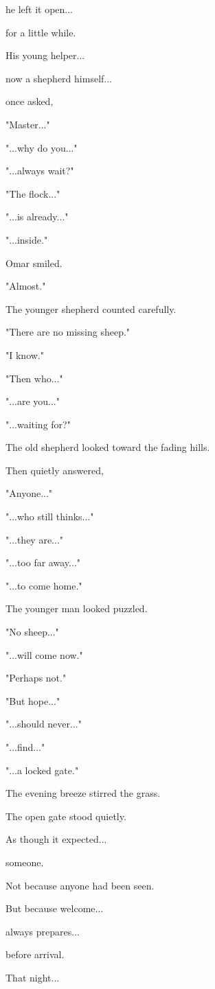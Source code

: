 \documentclass[12pt,openany]{book}
\begin{document}
he left it open...

for a little while.

His young helper...

now a shepherd himself...

once asked,

"Master..."

"...why do you..."

"...always wait?"

"The flock..."

"...is already..."

"...inside."

Omar smiled.

"Almost."

The younger shepherd counted carefully.

"There are no missing sheep."

"I know."

"Then who..."

"...are you..."

"...waiting for?"

The old shepherd looked toward the fading hills.

Then quietly answered,

"Anyone..."

"...who still thinks..."

"...they are..."

"...too far away..."

"...to come home."

The younger man looked puzzled.

"No sheep..."

"...will come now."

"Perhaps not."

"But hope..."

"...should never..."

"...find..."

"...a locked gate."

The evening breeze stirred the grass.

The open gate stood quietly.

As though it expected...

someone.

Not because anyone had been seen.

But because welcome...

always prepares...

before arrival.

That night...
\end{document}
